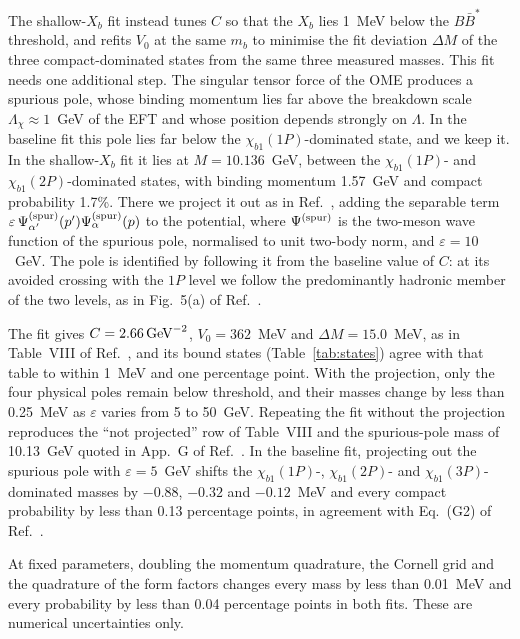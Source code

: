 The shallow-$X_b$ fit instead tunes $C$ so that the $X_b$ lies 1~MeV below
the $B\bar B^*$ threshold, and refits $V_0$ at the same $m_b$ to minimise the
fit deviation $\Delta M$ of the three compact-dominated states from the same
three measured masses.
This fit needs one additional step. The singular tensor force of the OME
produces a spurious pole, whose binding momentum lies far above the
breakdown scale $\Lambda_\chi\approx1$~GeV of the EFT and whose position
depends strongly on $\Lambda$.
In the baseline fit this pole lies far below the $\chi_{b1}(1P)$-dominated
state, and we keep it. In the shallow-$X_b$ fit it lies at $M=10.136$~GeV,
between the $\chi_{b1}(1P)$- and $\chi_{b1}(2P)$-dominated states, with
binding momentum 1.57~GeV and compact probability 1.7\%. There we project it
out as in Ref.~\cite{Zhang:2026iyr}, adding the separable term
$\varepsilon\,\Psi^{\rm(spur)}_{\alpha'}(p')\Psi^{\rm(spur)}_\alpha(p)$ to the
potential, where $\Psi^{\rm(spur)}$ is the two-meson wave function of the
spurious pole, normalised to unit two-body norm, and $\varepsilon=10$~GeV.
The pole is identified by following it from the baseline value of $C$: at
its avoided crossing with the $1P$ level we follow the predominantly hadronic
member of the two levels, as in Fig.~5(a) of Ref.~\cite{Zhang:2026iyr}.

The fit gives $C=2.66\,\mathrm{GeV}^{-2}$, $V_0=362$~MeV and $\Delta M=15.0$~MeV,
as in Table~VIII of Ref.~\cite{Zhang:2026iyr}, and its bound states
(Table~\ref{tab:states}) agree with that table to within 1~MeV and one
percentage point.
With the projection, only the four physical poles remain below threshold,
and their masses change by less than 0.25~MeV as $\varepsilon$ varies from
5 to 50~GeV. Repeating the fit without the projection reproduces the
``not projected'' row of Table~VIII and the spurious-pole mass of 10.13~GeV
quoted in App.~G of Ref.~\cite{Zhang:2026iyr}.
In the baseline fit, projecting out the spurious pole with
$\varepsilon=5$~GeV shifts the $\chi_{b1}(1P)$-, $\chi_{b1}(2P)$- and
$\chi_{b1}(3P)$-dominated masses by $-0.88$, $-0.32$ and $-0.12$~MeV and
every compact probability by less than 0.13 percentage points, in agreement
with Eq.~(G2) of Ref.~\cite{Zhang:2026iyr}.

At fixed parameters, doubling the momentum quadrature, the Cornell grid and
the quadrature of the form factors changes every mass by less than
0.01~MeV and every probability by less than 0.04 percentage points in both
fits. These are numerical uncertainties only.
